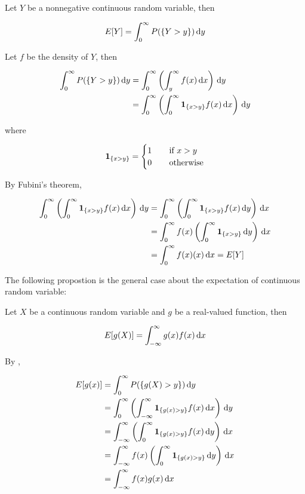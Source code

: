 \documentclass[a4paper,12pt]{article}
\begin{document}
\begin{pst}
  Let $Y$ be a nonnegative continuous random variable, then

  $$E[Y]=\int_{0}^{\infty}P(\left\{ Y>y\right\})\,\mathrm{d} y$$\s

  \prf Let $f$ be the density of $Y$, then

  $$\begin{aligned}[t]
    \int_{0}^{\infty}P(\left\{ Y>y\right\})\,\mathrm{d} y&=\int_{0}^{\infty}\left( \int_{y}^{\infty}f(x)\,\mathrm{d} x\right)\,\mathrm{d} y\\
    &=\int_{0}^{\infty}\left( \int_{0}^{\infty}\mathbf{1}_{\left\{ x>y\right\}}f(x)\,\mathrm{d} x\right)\,\mathrm{d} y
  \end{aligned}$$\s

  where

  $$\mathbf{1}_{\left\{ x>y\right\}}=\begin{cases}
    1&\;\;\;\;\text{if }x>y\\
    0&\;\;\;\;\text{otherwise}
  \end{cases}$$\s

  By Fubini's theorem,

  $$\begin{aligned}[t]
    \int_{0}^{\infty}\left( \int_{0}^{\infty}\mathbf{1}_{\left\{ x>y\right\}}f(x)\,\mathrm{d} x\right)\,\mathrm{d} y&=\int_{0}^{\infty}\left( \int_{0}^{\infty}\mathbf{1}_{\left\{ x>y\right\}}f(x)\,\mathrm{d} y\right)\,\mathrm{d} x\\
    &=\int_{0}^{\infty}f(x)\left( \int_{0}^{\infty}\mathbf{1}_{\left\{ x>y\right\}}\,\mathrm{d} y\right)\,\mathrm{d} x\\
    &=\int_{0}^{\infty}f(x)(x)\,\mathrm{d} x=E[Y]
  \end{aligned}$$
\end{pst}\n

The following propostion is the general case about the expectation of continuous random variable:\n

\begin{pst}
  Let $X$ be a continuous random variable and $g$ be a real-valued function, then

  $$E[g(X)]=\int_{-\infty}^{\infty}g(x)f(x)\,\mathrm{d} x$$\s

  \prf By \rpst[\sctr{1}],

  $$\begin{aligned}
    E[g(x)]&=\int_{0}^{\infty}P(\left\{ g(X)>y\right\})\,\mathrm{d} y\\
    &=\int_{0}^{\infty}\left( \int_{-\infty}^{\infty}\mathbf{1}_{\left\{ g(x)>y\right\}}f(x)\,\mathrm{d} x\right)\,\mathrm{d} y\\
    &=\int_{-\infty}^{\infty}\left( \int_{0}^{\infty}\mathbf{1}_{\left\{ g(x)>y\right\}}f(x)\,\mathrm{d} y\right)\,\mathrm{d} x\\
    &=\int_{-\infty}^{\infty}f(x)\left( \int_{0}^{\infty}\mathbf{1}_{\left\{ g(x)>y\right\}}\,\mathrm{d} y\right)\,\mathrm{d} x\\
    &=\int_{-\infty}^{\infty}f(x)g(x)\,\mathrm{d} x
  \end{aligned}$$
\end{pst}\n
\end{document}
